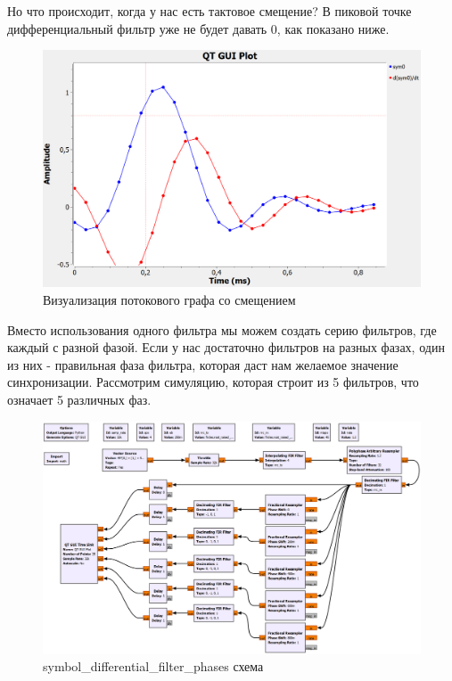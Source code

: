 \documentclass[a4paper,12pt]{report}
\begin{document}
Но что происходит, когда у нас есть тактовое смещение? В пиковой точке дифференциальный фильтр уже не будет давать 0, как показано ниже.

\begin{figure}[H]
        \centering
        \includegraphics[width=1.0\textwidth]{lab12_fig3_7.png}
        \caption{Визуализация потокового графа со смещением}
        \label{fig:lab12_fig3_7}
\end{figure}

Вместо использования одного фильтра мы можем создать серию фильтров, где каждый с разной фазой. Если у нас достаточно фильтров на разных фазах, один из них - правильная фаза фильтра, которая даст нам желаемое значение синхронизации. Рассмотрим симуляцию, которая строит из 5 фильтров, что означает 5 различных фаз.

\begin{figure}[H]
        \centering
        \includegraphics[width=1.0\textwidth]{lab12_fig3_8.png}
        \caption{symbol\_differential\_filter\_phases схема}
        \label{fig:lab12_fig3_8}
\end{figure}
\end{document}
